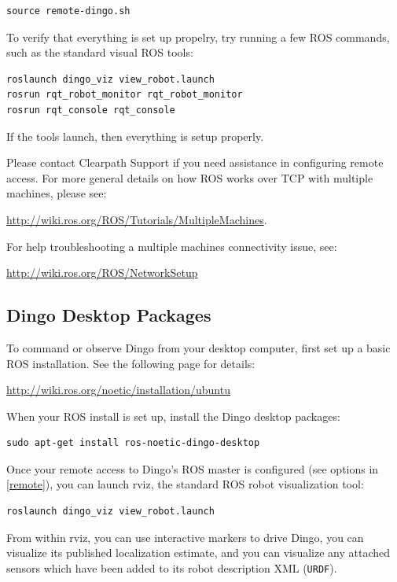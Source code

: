 \documentclass[]{clearpath-latex/clearpath-manual}
\begin{document}
\begin{lstlisting}
source remote-dingo.sh
\end{lstlisting}

To verify that everything is set up propelry, try running a few ROS commands, such as the standard visual ROS tools:

\begin{lstlisting}
roslaunch dingo_viz view_robot.launch
rosrun rqt_robot_monitor rqt_robot_monitor
rosrun rqt_console rqt_console
\end{lstlisting}

If the tools launch, then everything is setup properly.

Please contact Clearpath Support if you need assistance in configuring remote access. For more general details on how ROS works over TCP with multiple machines, please see:

\url{http://wiki.ros.org/ROS/Tutorials/MultipleMachines}.

For help troubleshooting a multiple machines connectivity issue, see:

\url{http://wiki.ros.org/ROS/NetworkSetup}

\newpage\subsection{Dingo Desktop Packages}

To command or observe Dingo from your desktop computer, first set up a basic
ROS installation. See the following page for details:

\url{http://wiki.ros.org/noetic/installation/ubuntu}

When your ROS install is set up, install the Dingo desktop packages:

\begin{lstlisting}
sudo apt-get install ros-noetic-dingo-desktop
\end{lstlisting}

Once your remote access to Dingo's ROS master is configured (see options in \autoref{remote}),
you can launch rviz, the standard ROS robot visualization tool:

\begin{lstlisting}
roslaunch dingo_viz view_robot.launch
\end{lstlisting}

From within rviz, you can use interactive markers to drive Dingo, you can visualize its
published localization estimate, and you can visualize any attached sensors which have been
added to its robot description XML (\lstinline{URDF}).
\end{document}
